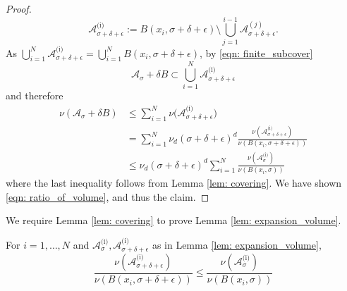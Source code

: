\documentclass[11pt,twoside]{article}
\newcommand{\1}{\mathbbm{1}}
\newcommand{\Aset}{\mathcal{A}}
\newcommand{\Asig}{\Aset_{\sigma}}
\begin{document}
\begin{proof}
	\begin{equation*}
	\Aset_{\sigma + \delta + \epsilon}^{\text{(i)}} := B(x_i,\sigma + \delta + \epsilon) \setminus \bigcup_{j = 1}^{i - 1} \Aset_{\sigma + \delta + \epsilon}^{(j)}. \tag{$i = 2,\ldots,N$}
	\end{equation*}
As $\bigcup_{i = 1}^{N} \Aset_{\sigma + \delta + \epsilon}^{\text{(i)}} = \bigcup_{i = 1}^{N} B(x_i,\sigma + \delta + \epsilon)$, by \eqref{eqn: finite_subcover}
	\begin{equation*}
	\Aset_{\sigma} + \delta B \subset \bigcup_{i =1}^{N} \Aset_{\sigma + \delta + \epsilon}^{\text{(i)}}
	\end{equation*}
	and therefore 
	\begin{align*}
	\nu(\Aset_\sigma + \delta B) & \leq \sum_{i = 1}^{N} \nu\bigl(\Aset_{\sigma + \delta + \epsilon}^{\text{(i)}}\bigr) \\
	& = \sum_{i = 1}^{N} \nu_d (\sigma + \delta + \epsilon)^d \frac{\nu(\Aset_{\sigma + \delta + \epsilon}^{\text{(i)}})}{\nu(B(x_i, \sigma + \delta + \epsilon))} \\
	& \leq \nu_d (\sigma + \delta + \epsilon)^d \sum_{i = 1}^{N} \frac{\nu(\Asig^{\text{(i)}})}{\nu(B(x_i,\sigma))}
	\end{align*}
	where the last inequality follows from Lemma \ref{lem: covering}. We have shown \eqref{eqn: ratio_of_volume}, and thus the claim.
\end{proof}
\noindent We require Lemma \ref{lem: covering} to prove Lemma \ref{lem: expansion_volume}.
\begin{lemma}
	\label{lem: covering}
	For $i = 1, \ldots, N$ and  $\Aset_{\sigma}^{\text{(i)}}, \Aset_{\sigma + \delta + \epsilon}^{\text{(i)}}$ as in Lemma \ref{lem: expansion_volume},
	\begin{equation*}
	\frac{\nu(\Aset_{\sigma + \delta + \epsilon}^{\text{(i)}})}{\nu(B(x_i, \sigma + \delta + \epsilon))} \leq \frac{\nu(\Aset_{\sigma}^{\text{(i)}})}{\nu(B(x_i, \sigma))}
	\end{equation*}
\end{lemma}
\end{document}
